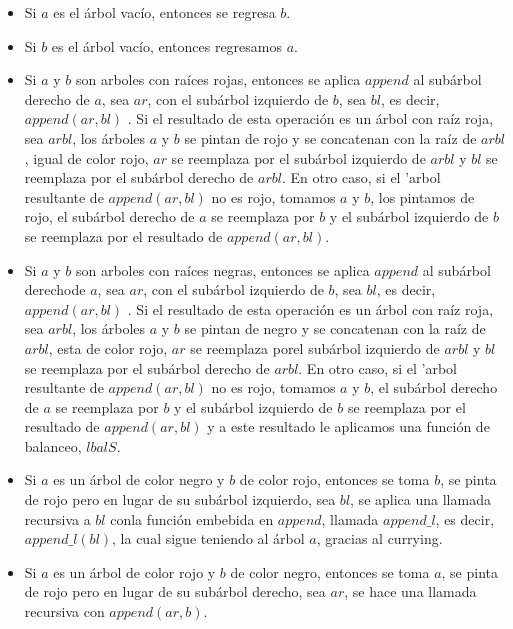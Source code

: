 \documentclass[8pt,leqno,pdflatex,spanish]{book}
\theoremstyle{plain}
\theoremstyle{definition}
\theoremstyle{remark}
\begin{document}
\begin{itemize}
    \item Si $a$ es el \'arbol vacío, entonces se regresa $b$.
    \item Si $b$ es el \'arbol vacío, entonces regresamos $a$.
    \item Si $a$ y $b$ son arboles con raíces rojas, entonces se aplica $append$ al subárbol 
    derecho de $a$, sea $ar$, con el subárbol izquierdo de $b$, sea $bl$, es decir, $append(ar,bl)$
    . Si el resultado de esta operación es un árbol con raíz roja, sea $arbl$, los \'arboles $a$ y 
    $b$ se pintan de rojo y se concatenan con la raíz de $arbl$, igual de color rojo, $ar$ se 
    reemplaza por el subárbol izquierdo de $arbl$ y $bl$ se reemplaza por el subárbol derecho de 
    $arbl$.
    En otro caso, si el 'arbol resultante de $append(ar,bl)$ no es rojo, tomamos $a$ y $b$, los 
    pintamos de rojo, el subárbol derecho de $a$ se reemplaza por $b$ y el subárbol izquierdo de 
    $b$ se reemplaza por el resultado de $append(ar,bl)$.
    \item Si $a$ y $b$ son arboles con raíces negras, entonces se aplica $append$ al subárbol 
    derechode $a$, sea $ar$, con el subárbol izquierdo de $b$, sea $bl$, es decir, $append(ar,bl)$
    . Si el resultado de esta operación es un árbol con raíz roja, sea $arbl$, los \'arboles $a$ y 
    $b$ se pintan de negro y se concatenan con la raíz de $arbl$, esta de color rojo, $ar$ se 
    reemplaza porel subárbol izquierdo de $arbl$ y $bl$ se reemplaza por el subárbol derecho de 
    $arbl$.
    En otro caso, si el 'arbol resultante de $append(ar,bl)$ no es rojo, tomamos $a$ y $b$, el 
    subárbol derecho de $a$ se reemplaza por $b$ y el subárbol izquierdo de $b$ se reemplaza por 
    el resultado de $append(ar,bl)$ y a este resultado le aplicamos una función de balanceo, 
    $lbalS$.
    \item Si $a$ es un \'arbol de color negro y $b$ de color rojo, entonces se toma $b$, se pinta 
    de rojo pero en lugar de su subárbol izquierdo, sea $bl$, se aplica una llamada recursiva a 
    $bl$ conla  funci\'on embebida en $append$, llamada $append\_l$, es decir, $append\_l(bl)$, la 
    cual sigue teniendo al \'arbol $a$, gracias al currying\cite{Currying}.
    \item Si $a$ es un \'arbol de color rojo y $b$ de color negro, entonces se toma $a$, se pinta 
    de rojo pero en lugar de su subárbol derecho, sea $ar$, se hace una llamada recursiva con 
    $append(ar,b)$.
\end{itemize}
\end{document}
